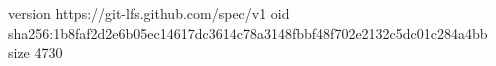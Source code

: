 version https://git-lfs.github.com/spec/v1
oid sha256:1b8faf2d2e6b05ec14617dc3614c78a3148fbbf48f702e2132c5dc01c284a4bb
size 4730
